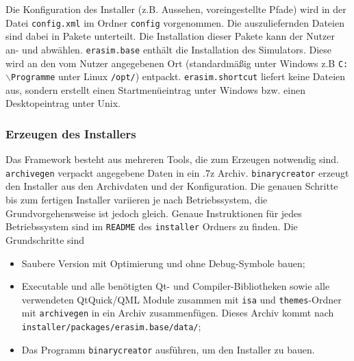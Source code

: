 Die Konfiguration des Installer (z.B. Aussehen, voreingestellte Pfade) wird in
der Datei \texttt{config.xml} im Ordner \texttt{config} vorgenommen. Die
auszuliefernden Dateien sind dabei in Pakete unterteilt. Die Installation dieser
Pakete kann der Nutzer an- und abwählen. \texttt{erasim.base} enthält die
Installation des Simulators. Diese wird an den vom Nutzer angegebenen Ort
(standardmäßig unter Windows z.B \texttt{C:$\backslash$Programme} unter Linux
\texttt{/opt/}) entpackt. \texttt{erasim.shortcut} liefert keine Dateien aus,
sondern erstellt einen Startmenüeintrag unter Windows bzw. einen Desktopeintrag
unter Unix.

\subsubsection{Erzeugen des Installers}

Das Framework besteht aus mehreren Tools, die zum Erzeugen notwendig sind.
\texttt{archivegen} verpackt angegebene Daten in ein .7z Archiv.
\texttt{binarycreator} erzeugt den Installer aus den Archivdaten und der
Konfiguration. Die genauen Schritte bis zum fertigen Installer variieren je nach
Betriebssystem, die Grundvorgehensweise ist jedoch gleich. Genaue Instruktionen
für jedes Betriebssystem sind im \texttt{README} des \texttt{installer} Ordners
zu finden. Die Grundschritte sind
\begin{itemize}
	\item Saubere Version mit Optimierung und ohne Debug-Symbole bauen;

	\item Executable und alle benötigten Qt- und Compiler-Bibliotheken sowie alle
	verwendeten QtQuick/QML Module zusammen mit \texttt{isa} und
	\texttt{themes}-Ordner mit \texttt{archivegen} in ein Archiv zusammenfügen.
	Dieses Archiv kommt nach \texttt{installer/packages/erasim.base/data/};

	\item Das Programm \texttt{binarycreator} ausführen, um den Installer zu
	bauen.

\end{itemize}
